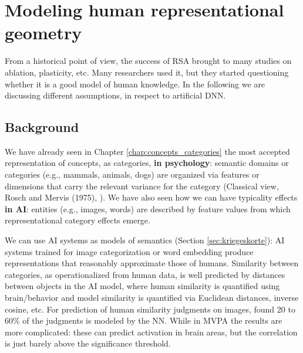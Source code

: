 \chapter{Modeling human representational geometry}
\label{chap:modeling_human}

From a historical point of view, the success of RSA brought to many studies on ablation, plasticity, etc. Many researchers used it, but they started questioning whether it is a good model of human knowledge. In the following we are discussing different assumptions, in respect to artificial DNN.

\section{Background}
We have already seen in Chapter \ref{chap:concepts_categories} the most accepted representation of concepts, as categories, \textbf{in psychology}: semantic domains or categories (e.g., mammals, animals, dogs) are organized via features or dimensions that carry the relevant variance for the category (Classical view, Rosch and Mervis (1975), \cite{lake-2015-deep}).
We have also seen how we can have typicality effects \textbf{in AI}: entities (e.g., images, words) are described by feature values from which representational category effects emerge.

We can use AI systems as models of semantics (Section \ref{sec:kriegeskorte}): AI systems trained for image categorization or word embedding produce representations that reasonably approximate those of humans. Similarity between categories, as operationalized from human data, is well predicted by distances between objects in the AI model, where human similarity is quantified using brain/behavior and model similarity is quantified via Euclidean distances, inverse cosine, etc.
For prediction of human similarity judgments on images, \notedv \cite{peterson} found 20 to 60\% of the judgments is modeled by the NN. While in MVPA the results are more complicated: these can predict activation in brain areas, but the correlation is just barely above the significance threshold.

